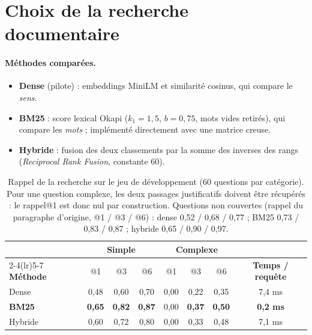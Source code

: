 \documentclass[11pt,a4paper]{article}
\begin{document}
\section{Choix de la recherche documentaire}\label{sec:recherche}

\paragraph{Méthodes comparées.}
\begin{itemize}
\item \textbf{Dense} (pilote) : embeddings MiniLM et similarité cosinus, qui compare le \emph{sens}.
\item \textbf{BM25} : score lexical Okapi ($k_1 = 1{,}5$, $b = 0{,}75$, mots vides retirés), qui compare
les \emph{mots} ; implémenté directement avec une matrice creuse.
\item \textbf{Hybride} : fusion des deux classements par la somme des inverses des rangs
(\textit{Reciprocal Rank Fusion}, constante 60).
\end{itemize}

\begin{table}[H]
\centering\small
\begin{tabular}{l c c c c c c c}
\toprule
& \multicolumn{3}{c}{\textbf{Simple}} & \multicolumn{3}{c}{\textbf{Complexe}} & \\
\cmidrule(lr){2-4}\cmidrule(lr){5-7}
\textbf{Méthode} & @1 & @3 & @6 & @1 & @3 & @6 & \textbf{Temps / requête} \\
\midrule
Dense   & 0,48 & 0,60 & 0,70 & 0,00 & 0,22 & 0,35 & 7,4 ms \\
\textbf{BM25} & \textbf{0,65} & \textbf{0,82} & \textbf{0,87} & 0,00 & \textbf{0,37} & \textbf{0,50} & \textbf{0,2 ms} \\
Hybride & 0,60 & 0,72 & 0,80 & 0,00 & 0,33 & 0,48 & 7,1 ms \\
\bottomrule
\end{tabular}
\caption{Rappel de la recherche sur le jeu de développement (60 questions par catégorie). Pour une
question complexe, les deux passages justificatifs doivent être récupérés : le rappel@1 est donc nul
par construction. Questions non couvertes (rappel du paragraphe d'origine, @1 / @3 / @6) : dense 0,52 /
0,68 / 0,77 ; BM25 0,73 / 0,83 / 0,87 ; hybride 0,65 / 0,90 / 0,97.}
\label{tab:recherche}
\end{table}
\end{document}
